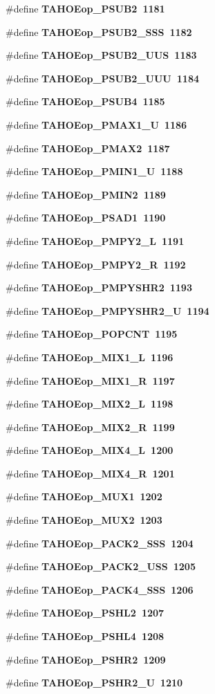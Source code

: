 \begin{CompactItemize}
\item 
\#define \bf{TAHOEop\_\-PSUB2}~1181
\item 
\#define \bf{TAHOEop\_\-PSUB2\_\-SSS}~1182
\item 
\#define \bf{TAHOEop\_\-PSUB2\_\-UUS}~1183
\item 
\#define \bf{TAHOEop\_\-PSUB2\_\-UUU}~1184
\item 
\#define \bf{TAHOEop\_\-PSUB4}~1185
\item 
\#define \bf{TAHOEop\_\-PMAX1\_\-U}~1186
\item 
\#define \bf{TAHOEop\_\-PMAX2}~1187
\item 
\#define \bf{TAHOEop\_\-PMIN1\_\-U}~1188
\item 
\#define \bf{TAHOEop\_\-PMIN2}~1189
\item 
\#define \bf{TAHOEop\_\-PSAD1}~1190
\item 
\#define \bf{TAHOEop\_\-PMPY2\_\-L}~1191
\item 
\#define \bf{TAHOEop\_\-PMPY2\_\-R}~1192
\item 
\#define \bf{TAHOEop\_\-PMPYSHR2}~1193
\item 
\#define \bf{TAHOEop\_\-PMPYSHR2\_\-U}~1194
\item 
\#define \bf{TAHOEop\_\-POPCNT}~1195
\item 
\#define \bf{TAHOEop\_\-MIX1\_\-L}~1196
\item 
\#define \bf{TAHOEop\_\-MIX1\_\-R}~1197
\item 
\#define \bf{TAHOEop\_\-MIX2\_\-L}~1198
\item 
\#define \bf{TAHOEop\_\-MIX2\_\-R}~1199
\item 
\#define \bf{TAHOEop\_\-MIX4\_\-L}~1200
\item 
\#define \bf{TAHOEop\_\-MIX4\_\-R}~1201
\item 
\#define \bf{TAHOEop\_\-MUX1}~1202
\item 
\#define \bf{TAHOEop\_\-MUX2}~1203
\item 
\#define \bf{TAHOEop\_\-PACK2\_\-SSS}~1204
\item 
\#define \bf{TAHOEop\_\-PACK2\_\-USS}~1205
\item 
\#define \bf{TAHOEop\_\-PACK4\_\-SSS}~1206
\item 
\#define \bf{TAHOEop\_\-PSHL2}~1207
\item 
\#define \bf{TAHOEop\_\-PSHL4}~1208
\item 
\#define \bf{TAHOEop\_\-PSHR2}~1209
\item 
\#define \bf{TAHOEop\_\-PSHR2\_\-U}~1210
\item 

\end{CompactItemize}

